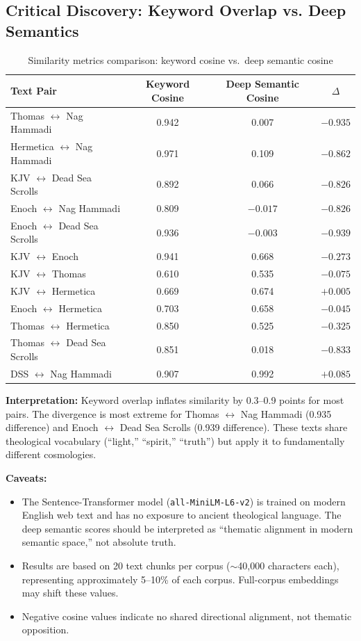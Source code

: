 \documentclass[11pt]{article}
\begin{document}
\subsection{Critical Discovery: Keyword Overlap vs. Deep Semantics}

\begin{table}[h]
\centering
\begin{tabular}{@{}lccc@{}}
\toprule
Text Pair & Keyword Cosine & Deep Semantic Cosine & $\Delta$ \\
\midrule
Thomas $\leftrightarrow$ Nag Hammadi & 0.942 & 0.007 & $-0.935$ \\
Hermetica $\leftrightarrow$ Nag Hammadi & 0.971 & 0.109 & $-0.862$ \\
KJV $\leftrightarrow$ Dead Sea Scrolls & 0.892 & 0.066 & $-0.826$ \\
Enoch $\leftrightarrow$ Nag Hammadi & 0.809 & $-0.017$ & $-0.826$ \\
Enoch $\leftrightarrow$ Dead Sea Scrolls & 0.936 & $-0.003$ & $-0.939$ \\
KJV $\leftrightarrow$ Enoch & 0.941 & 0.668 & $-0.273$ \\
KJV $\leftrightarrow$ Thomas & 0.610 & 0.535 & $-0.075$ \\
KJV $\leftrightarrow$ Hermetica & 0.669 & 0.674 & $+0.005$ \\
Enoch $\leftrightarrow$ Hermetica & 0.703 & 0.658 & $-0.045$ \\
Thomas $\leftrightarrow$ Hermetica & 0.850 & 0.525 & $-0.325$ \\
Thomas $\leftrightarrow$ Dead Sea Scrolls & 0.851 & 0.018 & $-0.833$ \\
DSS $\leftrightarrow$ Nag Hammadi & 0.907 & 0.992 & $+0.085$ \\
\bottomrule
\end{tabular}
\caption{Similarity metrics comparison: keyword cosine vs.\ deep semantic cosine}
\end{table}

\textbf{Interpretation:} Keyword overlap inflates similarity by 0.3--0.9 points for most pairs. The divergence is most extreme for Thomas $\leftrightarrow$ Nag Hammadi (0.935 difference) and Enoch $\leftrightarrow$ Dead Sea Scrolls (0.939 difference). These texts share theological vocabulary (``light,'' ``spirit,'' ``truth'') but apply it to fundamentally different cosmologies.

\textbf{Caveats:}
\begin{itemize}
    \item The Sentence-Transformer model (\texttt{all-MiniLM-L6-v2}) is trained on modern English web text and has no exposure to ancient theological language. The deep semantic scores should be interpreted as ``thematic alignment in modern semantic space,'' not absolute truth.
    \item Results are based on 20 text chunks per corpus ($\sim$40,000 characters each), representing approximately 5--10\% of each corpus. Full-corpus embeddings may shift these values.
    \item Negative cosine values indicate no shared directional alignment, not thematic opposition.
\end{itemize}
\end{document}

